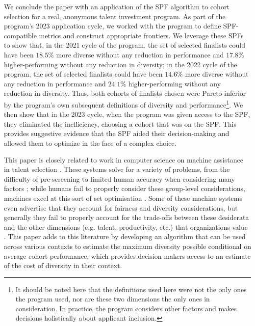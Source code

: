 We conclude the paper with an application of the SPF algorithm to cohort selection for a real, anonymous talent investment program. As part of the program's 2023 application cycle, we worked with the program to define SPF-compatible metrics and construct appropriate frontiers. We leverage these SPFs to show that, in the 2021 cycle of the program, the set of selected finalists could have been $18.5\%$ more diverse without any reduction in performance and $17.8\%$ higher-performing without any reduction in diversity; in the 2022 cycle of the program, the set of selected finalists could have been $14.6\%$ more diverse without any reduction in performance and $24.1\%$ higher-performing without any reduction in diversity. Thus, both cohorts of finalists chosen were Pareto inferior by the program's own subsequent definitions of diversity and performance\footnote{It should be noted here that the definitions used here were not the only ones the program used, nor are these two dimensions the only ones in consideration. In practice, the program considers other factors and makes decisions holistically about applicant inclusion.}. We then show that in the 2023 cycle, when the program was given access to the SPF, they eliminated the inefficiency, choosing a cohort that was on the SPF. This provides suggestive evidence that the SPF aided their decision-making and allowed them to optimize in the face of a complex choice.

This paper is closely related to work in computer science on machine assistance in talent selection \cite{dwivedi2021artificial, tambe2019artificial, raghavan2020mitigating}. These systems solve for a variety of problems, from the difficulty of pre-screening to limited human accuracy when considering many factors \cite{tambe2019artificial}; while humans fail to properly consider these group-level considerations, machines excel at this sort of set optimisation \cite{krause2014submodular}. Some of these machine systems even advertise that they account for fairness and diversity considerations, but generally they fail to properly account for the trade-offs between these desiderata and the other dimensions (e.g. talent, productivity, etc.) that organizations value \cite{raghavan2020mitigating, gillet2011diversity,huppenkothen2020entrofy}. This paper adds to this literature by developing an algorithm that can be used across various contexts to estimate the maximum diversity possible conditional on average cohort performance, which provides decision-makers access to an estimate of the cost of diversity in their context. 

